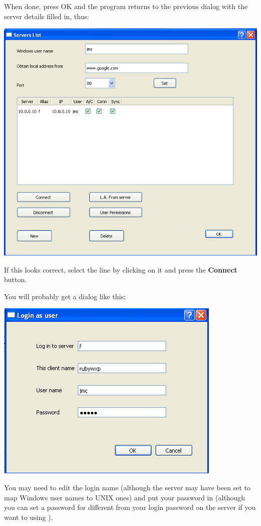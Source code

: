 When done, press OK and the program returns to the previous dialog with the server details filled in, thus:

\includegraphics{img/btqwnewhostsetlist.png}

If this looks correct, select the line by clicking on it and press the \textbf{Connect} button.

You will probably get a dialog like this:

\includegraphics{img/btqwlogin.png}

You may need to edit the login name (although the server may have been set to map Windows user names to UNIX ones) and put your password in
(although you can set a password for \ProductName{} different from your login password on the server if you want to using \PrXipasswd).

